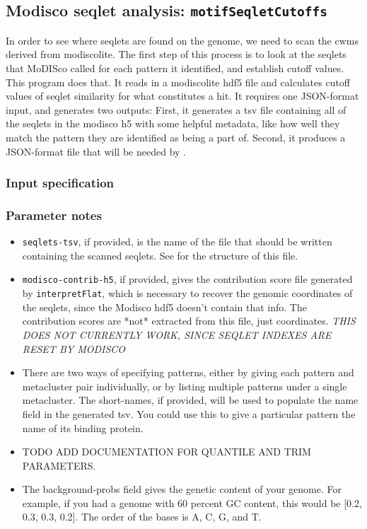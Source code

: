 \documentclass{article}
\begin{document}
\subsection{Modisco seqlet analysis: \texttt{motifSeqletCutoffs}}\label{prog:motifSeqletCutoffs}
In order to see where seqlets are found on the genome, we need to scan the cwms
derived from modiscolite.
The first step of this process is to look at the seqlets that MoDISco called for
each pattern it identified, and establish cutoff values.
This program does that.
It reads in a modiscolite hdf5 file and calculates cutoff values of seqlet
similarity for what constitutes a hit.
It requires one JSON-format input, and generates two outputs: First, it
generates a tsv file containing all of the seqlets in the modisco h5 with some
helpful metadata, like how well they match the pattern they are identified
as being a part of.
Second, it produces a JSON-format file that will be needed
by .

\subsubsection{Input specification}


\subsubsection{Parameter notes}
\begin{itemize}
    \item \texttt{seqlets-tsv}, if provided, is the name of the file that should
        be written containing the scanned seqlets.
        See  for the structure of this file.
    \item \texttt{modisco-contrib-h5}, if provided, gives the contribution score
        file generated by \texttt{interpretFlat}, which is necessary to recover
        the genomic coordinates of the seqlets, since the Modisco hdf5 doesn't
        contain that info.
        The contribution scores are *not* extracted from this file, just
        coordinates.
        \emph{THIS DOES NOT CURRENTLY WORK, SINCE SEQLET INDEXES ARE RESET BY
        MODISCO}
    \item There are two ways of specifying patterns, either by giving each
        pattern and metacluster pair individually, or by listing multiple
        patterns under a single metacluster.
        The short-names, if provided, will be used to populate the name field in
        the generated tsv.
        You could use this to give a particular pattern the name of its binding
        protein.
    \item TODO ADD DOCUMENTATION FOR QUANTILE AND TRIM PARAMETERS.
    \item The background-probs field gives the genetic content of your genome.
        For example, if you had a genome with 60 percent GC content, this would
        be [0.2, 0.3, 0.3, 0.2].
        The order of the bases is A, C, G, and T.
\end{itemize}
\end{document}
